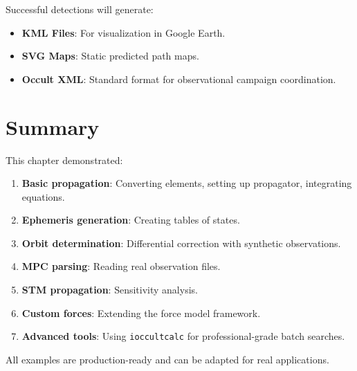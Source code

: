 Successful detections will generate:
\begin{itemize}
    \item \textbf{KML Files}: For visualization in Google Earth.
    \item \textbf{SVG Maps}: Static predicted path maps.
    \item \textbf{Occult XML}: Standard format for observational campaign coordination.
\end{itemize}

\section{Summary}

This chapter demonstrated:

\begin{enumerate}
    \item \textbf{Basic propagation}: Converting elements, setting up propagator, integrating equations.
    \item \textbf{Ephemeris generation}: Creating tables of states.
    \item \textbf{Orbit determination}: Differential correction with synthetic observations.
    \item \textbf{MPC parsing}: Reading real observation files.
    \item \textbf{STM propagation}: Sensitivity analysis.
    \item \textbf{Custom forces}: Extending the force model framework.
    \item \textbf{Advanced tools}: Using \texttt{ioccultcalc} for professional-grade batch searches.
\end{enumerate}

All examples are production-ready and can be adapted for real applications.
